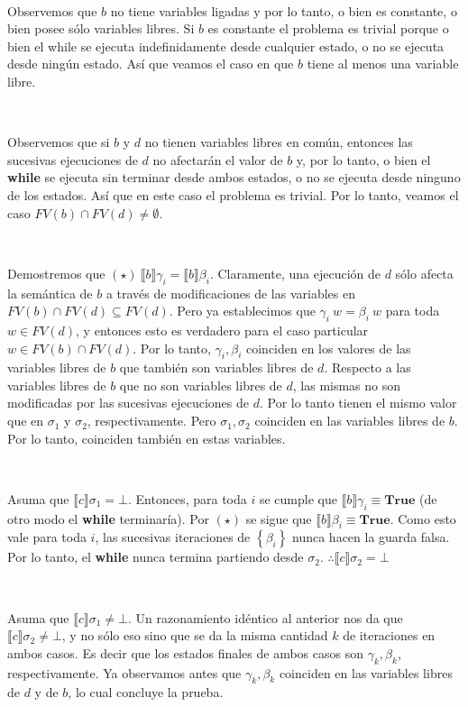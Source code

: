 \documentclass[a4paper, 12pt]{article}
\begin{document}
~ 

Observemos que $b$ no tiene variables ligadas y por lo tanto, o bien es
constante, o bien posee sólo variables libres. Si $b$ es constante el problema
es trivial porque o bien el while se ejecuta indefinidamente desde cualquier
estado, o no se ejecuta desde ningún estado. Así que veamos el caso en que $b$
tiene al menos una variable libre.

~ 

Observemos que si $b$ y $d$ no tienen variables libres en común, entonces las
sucesivas ejecuciones de $d$ no afectarán el valor de $b$ y, por lo tanto, o
bien el \textbf{while} se ejecuta sin terminar desde ambos estados, o no se
ejecuta desde ninguno de los estados. Así que en este caso el problema es
trivial. Por lo tanto, veamos el caso $FV(b) \cap FV(d) \neq \emptyset$.


~

Demostremos que $(\star) ~  \llbracket b \rrbracket\gamma_i = \llbracket b
\rrbracket\beta_i$. Claramente, una ejecución de $d$ sólo afecta la semántica de
$b$ a través de modificaciones de las variables en $FV(b) \cap FV(d) \subseteq
FV(d)$. Pero ya establecimos que $\gamma_i ~ w = \beta_i ~ w$ para toda
$w \in FV(d)$, y entonces esto es verdadero para el caso particular $w \in FV(b)
\cap FV(d)$. Por lo tanto, $\gamma_i, \beta_i$ coinciden en los valores de las
variables libres de $b$ que también son variables libres de $d$. Respecto a las
variables libres de $b$ que no son variables libres de $d$, las mismas no son
modificadas por las sucesivas ejecuciones de $d$. Por lo tanto tienen el mismo
valor que en $\sigma_1$ y $\sigma_2$, respectivamente. Pero $\sigma_1, \sigma_2$
coinciden en las variables libres de $b$. Por lo tanto, coinciden también en
estas variables.

~

Asuma que $\llbracket c \rrbracket\sigma_1 =\bot $. Entonces, para toda $i$ se
cumple que $\llbracket b \rrbracket\gamma_i \equiv \textbf{True}$ (de otro modo
el \textbf{while} terminaría). Por $(\star)$ se sigue que $\llbracket b
\rrbracket\beta_i \equiv \textbf{True}$. Como esto vale para toda $i$, las
sucesivas iteraciones de $\left\{ \beta_i \right\} $ nunca hacen la guarda
falsa. Por lo tanto, el \textbf{while} nunca termina partiendo desde $\sigma_2$.
$\therefore \llbracket c \rrbracket\sigma_2 = \bot $

~ 

Asuma que $\llbracket c \rrbracket\sigma_1 \neq \bot$. Un razonamiento idéntico
al anterior nos da que $\llbracket c \rrbracket\sigma_2 \neq \bot $, y no sólo
eso sino que se da la misma cantidad $k$ de iteraciones en ambos casos. Es decir
que los estados finales de ambos casos son $\gamma_k, \beta_k$, respectivamente.
Ya observamos antes que $\gamma_k, \beta_k$ coinciden en las variables libres de
$d$ y de $b$, lo cual concluye la prueba.
\end{document}
